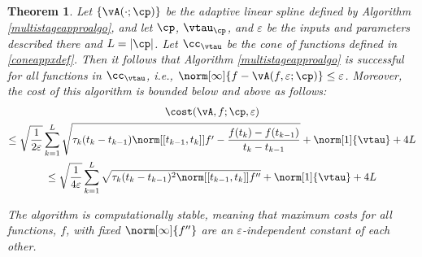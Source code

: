 \documentclass[]{elsarticle}
\newtheorem{theorem}{Theorem}
\theoremstyle{definition}
\theoremstyle{remark}
\begin{document}
\begin{theorem} \label{multistageappxthm}
Let $\{\vA(\cdot;\cp)\}$ be the adaptive linear spline defined by Algorithm \ref{multistageapproalgo}, and let $\cp$, $\vtau_{\cp}$, and $\varepsilon$ be the inputs and parameters described there and $L=|\cp|$. Let $\cc_{\vtau}$ be the cone of functions defined in \eqref{coneappxdef}.  Then it follows that Algorithm \ref{multistageapproalgo} is successful for all functions in $\cc_{\vtau}$,  i.e.,  $\norm[\infty]{f - \vA(f,\varepsilon;\cp)} \le \varepsilon$.  Moreover, the cost of this algorithm is bounded below and above as follows:
\begin{multline}
\cost(\vA,f;\cp,\varepsilon) \\
\le \sqrt{\frac{1}{2\varepsilon}}\sum\limits_{k=1}^{L}\sqrt{\tau_k(t_k-t_{k-1})\norm[{[t_{k-1},t_k]}]{f'-\frac{f(t_k)-f(t_{k-1})}{t_k-t_{k-1}}}}+\norm[1]{\vtau}+4L
\\
\le \sqrt{\frac{1}{4\varepsilon}}\sum\limits_{k=1}^{L}\sqrt{\tau_k(t_k-t_{k-1})^2\norm[{[t_{k-1},t_k]}]{f''}}+\norm[1]{\vtau}+4L
 \end{multline}

The algorithm is computationally stable, meaning that maximum costs for all functions, $f$, with fixed $\norm[\infty]{f''}$ are an $\varepsilon$-independent constant of each other.
\end{theorem}
\end{document}

